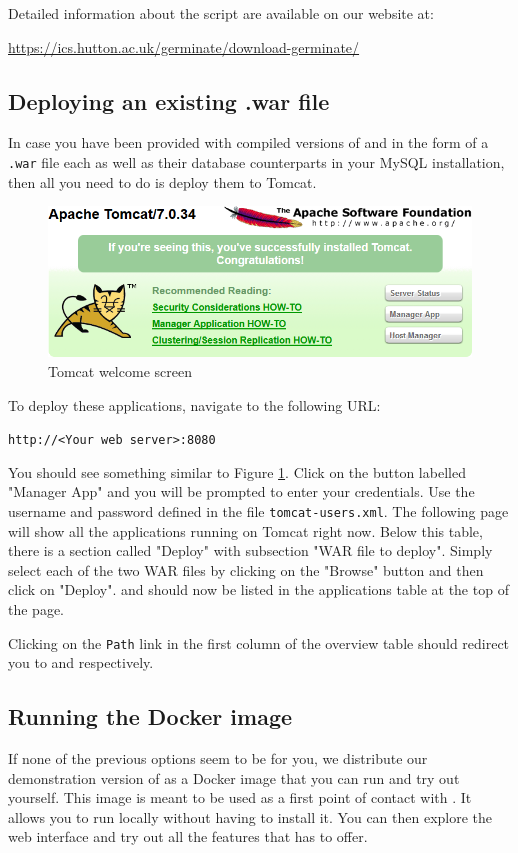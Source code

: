 Detailed information about the script are available on our website at:

\begin{center}
	\url{https://ics.hutton.ac.uk/germinate/download-germinate/}
\end{center}

\subsection{Deploying an existing {\germinate} .war file}
In case you have been provided with compiled versions of {\germinate} and {\gatekeeper} in the form of a \texttt{.war} file each as well as their database counterparts in your MySQL installation, then all you need to do is deploy them to Tomcat.

\begin{figure}
	\centering
	\includegraphics[scale=0.5]{img/setup/tomcat.png}
	\caption{Tomcat welcome screen}
	\label{fig:tomcat}
\end{figure}
\noindent
To deploy these applications, navigate to the following URL:
\begin{center}
	\texttt{http://<Your web server>:8080}
\end{center}
You should see something similar to Figure \ref{fig:tomcat}. Click on the button labelled "Manager App" and you will be prompted to enter your credentials. Use the username and password defined in the file \texttt{tomcat-users.xml}. The following page will show all the applications running on Tomcat right now. Below this table, there is a section called "Deploy" with subsection "WAR file to deploy". Simply select each of the two WAR files by clicking on the "Browse" button and then click on "Deploy". {\germinate} and {\gatekeeper} should now be listed in the applications table at the top of the page.

Clicking on the \texttt{Path} link in the first column of the overview table should redirect you to {\germinate} and {\gatekeeper} respectively.

\subsection{Running the {\germinate} Docker image}
If none of the previous options seem to be for you, we distribute our demonstration version of {\germinate} as a Docker image that you can run and try out yourself. This image is meant to be used as a first point of contact with {\germinate}. It allows you to run {\germinate} locally without having to install it. You can then explore the web interface and try out all the features that {\germinate} has to offer.


